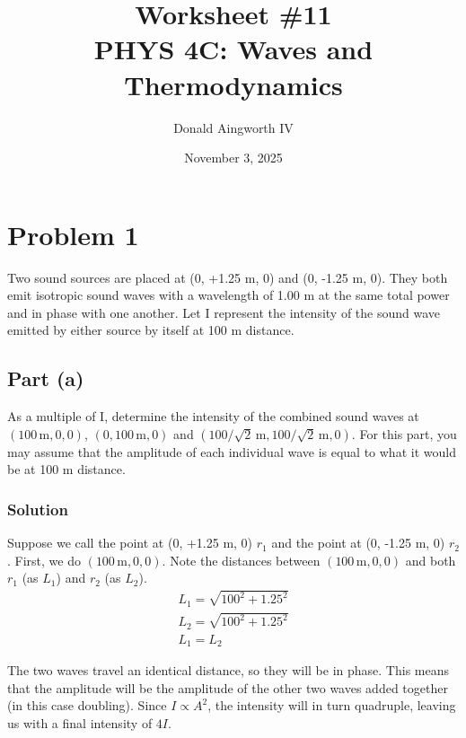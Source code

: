 \documentclass[12pt]{article}
\title{
    Worksheet \#11
    \\  \small
    PHYS 4C: Waves and Thermodynamics
    }
\author{Donald Aingworth IV}
\date{November 3, 2025}
\begin{document}

    \maketitle

    \setcounter{section}{0}
    \section{Problem 1}
        Two sound sources are placed at (0, +1.25 m, 0) and (0, -1.25 m, 0). 
        They both emit isotropic sound waves with a wavelength of 1.00 m at the same total power and in phase with one another. 
        Let I represent the intensity of the sound wave emitted by either source by itself at 100 m distance.

        \subsection{Part (a)}
            As a multiple of I, determine the intensity of the combined sound waves at $(100\,\unit{\meter}, 0, 0)$, $(0, 100\,\unit{\meter}, 0)$ and $(100/\sqrt{2}\,\unit{\meter}, 100/\sqrt{2}\,\unit{\meter}, 0)$. 
            For this part, you may assume that the amplitude of each individual wave is equal to what it would be at 100 m distance.

            \subsubsection{Solution}
                Suppose we call the point at (0, +1.25 m, 0) $r_1$ and the point at (0, -1.25 m, 0) $r_2$.
                First, we do $(100\,\unit{\meter}, 0, 0)$.
                Note the distances between $(100\,\unit{\meter}, 0, 0)$ and both $r_1$ (as $L_1$) and $r_2$ (as $L_2$).
                \begin{gather}
                    L_1 = \sqrt{100^2 + 1.25^2}\\
                    L_2 = \sqrt{100^2 + 1.25^2}\\
                    L_1 = L_2
                \end{gather}

                The two waves travel an identical distance, so they will be in phase. 
                This means that the amplitude will be the amplitude of the other two waves added together (in this case doubling).
                Since $I \varpropto A^2$, the intensity will in turn quadruple, leaving us with a final intensity of $4I$.
\end{document}
